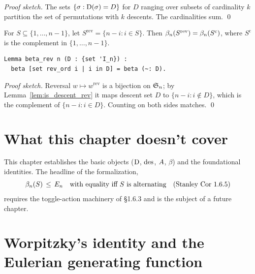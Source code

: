\noindent
\emph{Proof sketch.} The sets $\{\sigma : \mathrm{D}(\sigma) = D\}$ for
$D$ ranging over subsets of cardinality $k$ partition the set of
permutations with $k$ descents. The cardinalities sum. \qed

\begin{lemma}
  \label{lem:beta_rev}
  For $S \subseteq \{1, \dots, n-1\}$, let $S^{\mathrm{rev}} =
  \{n - i : i \in S\}$. Then
  $\beta_{n}(S^{\mathrm{rev}}) = \beta_{n}(S^{\mathrm{c}})$,
  where $S^{\mathrm{c}}$ is the complement in $\{1, \dots, n-1\}$.
\end{lemma}

\begin{lstlisting}[language=Rocq]
Lemma beta_rev n (D : {set 'I_n}) :
  beta [set rev_ord i | i in D] = beta (~: D).
\end{lstlisting}


\noindent
\emph{Proof sketch.} Reversal $w \mapsto w^{\mathrm{rev}}$ is a
bijection on $\mathfrak{S}_{n}$; by Lemma~\ref{lem:is_descent_rev} it maps
descent set $D$ to $\{n - i : i \notin D\}$, which is the
complement of $\{n - i : i \in D\}$. Counting on both sides
matches. \qed

\section{What this chapter doesn't cover}

This chapter establishes the basic objects ($\mathrm{D}$, $\mathrm{des}$,
$A$, $\beta$) and the foundational identities. The headline
of the formalization,
\[
  \beta_{n}(S) \,\leq\, E_n
  \quad \text{with equality iff } S \text{ is alternating}
  \quad (\text{Stanley Cor 1.6.5})
\]
requires the toggle-action machinery of \S1.6.3 and is the subject
of a future chapter.

\section{Worpitzky's identity and the Eulerian generating function}

